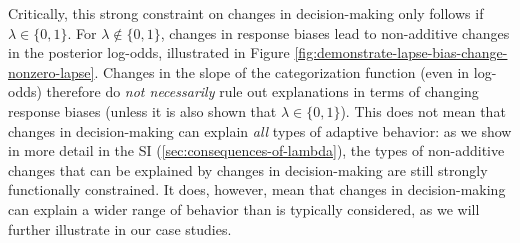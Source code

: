 \documentclass[
  11pt,
  man,floatsintext]{apa6}
\begin{document}
Critically, this strong constraint on changes in decision-making only follows if \(\lambda \in \{0,1\}\). For \(\lambda \not\in \{0,1\}\), changes in response biases lead to non-additive changes in the posterior log-odds, illustrated in Figure \ref{fig:demonstrate-lapse-bias-change-nonzero-lapse}. Changes in the slope of the categorization function (even in log-odds) therefore do \emph{not necessarily} rule out explanations in terms of changing response biases (unless it is also shown that \(\lambda \in \{0,1\}\)). This does not mean that changes in decision-making can explain \emph{all} types of adaptive behavior: as we show in more detail in the SI (\ref{sec:consequences-of-lambda}), the types of non-additive changes that can be explained by changes in decision-making are still strongly functionally constrained. It does, however, mean that changes in decision-making can explain a wider range of behavior than is typically considered, as we will further illustrate in our case studies.
\end{document}
